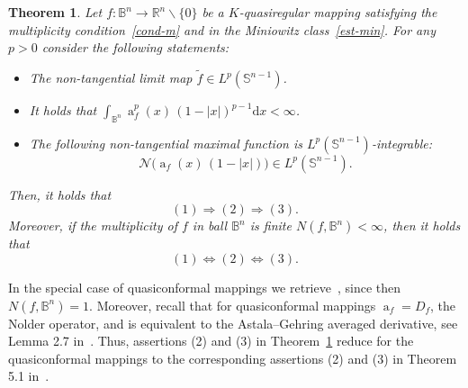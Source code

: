\documentclass[11pt,a4paper,reqno]{amsart}
\newtheorem{theorem}{Theorem}[section]
\theoremstyle{definition}
\renewcommand{\a}{\operatorname{a}}
\newcommand{\B}{\mathbb{B}^n}
\newcommand{\Nm}{\mathcal{N}}
\newcommand{\R}{\mathbb{R}}
\newcommand{\ud}{\mathrm {d}}
\newcommand{\Sn}{\mathbb{S}^{n-1}}
\newcommand{\blue}{\color{blau}}
\newcounter{komcounter}
\numberwithin{komcounter}{section}
\newcommand{\komT}[1]{{\bf \blue [\refstepcounter{komcounter}\thekomcounter (by T): #1]}}
\begin{document}
\begin{theorem}\label{thm:characterizationsnolder}
	Let $f:\B\rightarrow \R^n\backslash\{ 0\}$ be a $K$-quasiregular mapping satisfying the multiplicity condition~\eqref{cond-m} and in the Miniowitz class~\eqref{est-min}. For any $p>0$ consider the following statements:
\begin{itemize}
\item[(1)] The non-tangential limit map $\tilde f\in L^p(\Sn)$.
\item[(2)]  It holds that $\int_{\B}\a_f^p(x)\, (1-|x|)^{p-1}\ud x<\infty$.
%
\item[(3)] The following non-tangential maximal function is $L^p(\Sn)$-integrable:
$$
\Nm\big(\a_f (x)\, (1-|x|)\big) \in L^p(\Sn).
$$
 \end{itemize}
Then, it holds that 
\[
  (1) \Rightarrow (2) \Rightarrow (3).
\]
Moreover, if the multiplicity of $f$ in ball $\B$ is finite $N(f,\B)<\infty$, then it holds that
\[
(1) \Leftrightarrow (2) \Leftrightarrow (3).
\]
\end{theorem}

In the special case of quasiconformal mappings we retrieve~\cite[Theorem 5.1]{ak}, since then $N(f, \B)=1$. Moreover, recall that for quasiconformal mappings $\a_f=D_f$, the Nolder operator, and is equivalent to the Astala--Gehring averaged derivative, see Lemma 2.7 in~\cite{no}. Thus, assertions (2) and (3) in Theorem~\ref{thm:characterizationsnolder} reduce for the quasiconformal mappings to the corresponding assertions (2) and (3) in Theorem 5.1 in~\cite{ak}.
\end{document}
